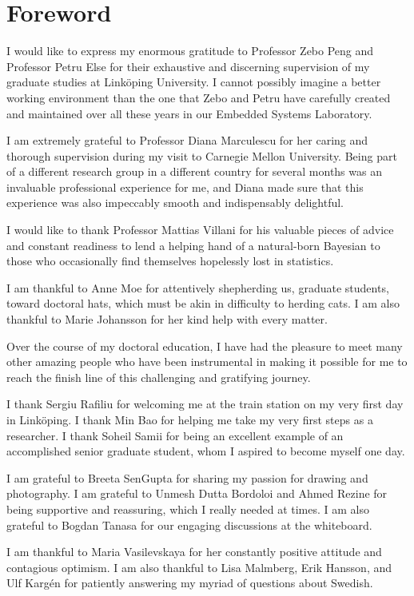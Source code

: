 \chapter*{Foreword}

I would like to express my enormous gratitude to Professor Zebo Peng and
Professor Petru Else for their exhaustive and discerning supervision of my
graduate studies at Linköping University. I cannot possibly imagine a better
working environment than the one that Zebo and Petru have carefully created and
maintained over all these years in our Embedded Systems Laboratory.

I am extremely grateful to Professor Diana Marculescu for her caring and
thorough supervision during my visit to Carnegie Mellon University. Being part
of a different research group in a different country for several months was an
invaluable professional experience for me, and Diana made sure that this
experience was also impeccably smooth and indispensably delightful.

I would like to thank Professor Mattias Villani for his valuable pieces of
advice and constant readiness to lend a helping hand of a natural-born Bayesian
to those who occasionally find themselves hopelessly lost in statistics.

I am thankful to Anne Moe for attentively shepherding us, graduate students,
toward doctoral hats, which must be akin in difficulty to herding cats. I am
also thankful to Marie Johansson for her kind help with every matter.

Over the course of my doctoral education, I have had the pleasure to meet many
other amazing people who have been instrumental in making it possible for me to
reach the finish line of this challenging and gratifying journey.

I thank Sergiu Rafiliu for welcoming me at the train station on my very first
day in Linköping. I thank Min Bao for helping me take my very first steps as a
researcher. I thank Soheil Samii for being an excellent example of an
accomplished senior graduate student, whom I aspired to become myself one day.

I am grateful to Breeta SenGupta for sharing my passion for drawing and
photography. I am grateful to Unmesh Dutta Bordoloi and Ahmed Rezine for being
supportive and reassuring, which I really needed at times. I am also grateful to
Bogdan Tanasa for our engaging discussions at the whiteboard.

I am thankful to Maria Vasilevskaya for her constantly positive attitude and
contagious optimism. I am also thankful to Lisa Malmberg, Erik Hansson, and Ulf
Kargén for patiently answering my myriad of questions about Swedish.

